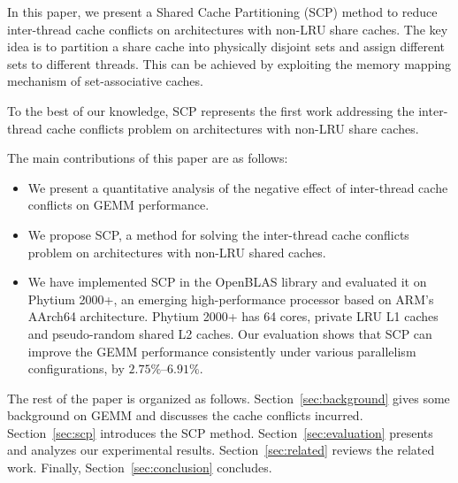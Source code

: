 In this paper, we present a Shared Cache Partitioning (SCP) method
to reduce inter-thread cache conflicts on architectures with non-LRU share caches.
The key idea is to partition a
share cache into physically disjoint sets
and assign different sets to different threads. This can be achieved by
exploiting the memory mapping mechanism of set-associative caches.

To the best of our knowledge, SCP represents
the first work addressing
the inter-thread cache conflicts problem on
architectures with non-LRU share caches.

The main contributions of this paper are as follows:
\begin{itemize}
\item We present a quantitative analysis of the negative effect of inter-thread cache
  conflicts on GEMM performance.
\item We propose SCP, a method for solving the inter-thread cache conflicts
  problem on architectures with non-LRU shared caches.
\item We have implemented SCP in the OpenBLAS library and evaluated it on Phytium 2000+,
  an emerging high-performance processor based on ARM's AArch64 architecture.
  Phytium 2000+ has 64 cores, private LRU L1 caches
  and pseudo-random shared L2 caches.
  Our evaluation shows that SCP can improve the GEMM performance consistently
  under various parallelism configurations, by $2.75\%$--$6.91\%$.
\end{itemize}


The rest of the paper is organized as follows.
Section~\ref{sec:background} gives some background on GEMM and discusses
the cache conflicts incurred.
Section~\ref{sec:scp} introduces the SCP method.
Section~\ref{sec:evaluation} presents and
analyzes our experimental results.
Section~\ref{sec:related} reviews the related work.
Finally, Section~\ref{sec:conclusion} concludes.

